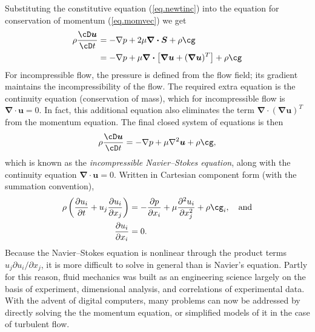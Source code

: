 \documentclass[twoside,11pt]		{report}
\begin{document}
Substituting the constitutive equation (\ref{eq.newtinc}) into the
equation for conservation of momentum (\ref{eq.momvec}) we get
\begin{align}
\rho\frac{\cD \bm{u}}{\cD t}
&=
-\nabla p + 2\mu\bm{\nabla\cdot S} +
 \rho\bm{\cg}\\
&=
-\nabla p+\mu\bm{\nabla\cdot}\left[\bm{\nabla u}+(\bm{\nabla u})^T\right] + 
 \rho\bm{\cg}
\end{align}
For incompressible flow, the pressure is defined from the flow field;
its gradient maintains the incompressibility of the flow. The required
extra equation is the continuity equation (conservation of mass),
which for incompressible flow is $\bm{\nabla\cdot u}=0$.  In fact,
this additional equation also eliminates the term
$\bm{\nabla\cdot}(\bm{\nabla u})^T$ from the momentum equation. The
final closed system of equations is then
\begin{equation}
\rho\frac{\cD \bm{u}}{\cD t}
=
-\nabla p+\mu\nabla^2\bm{u} + \rho\bm{\cg},
\end{equation}
which is known as the \emph{incompressible Navier--Stokes equation},
along with the continuity equation $\bm{\nabla\cdot u}=0$.  Written in
Cartesian component form (with the summation convention),
\begin{align}
\rho\left(\frac{\partial u_i}{\partial t} + u_j\frac{\partial
  u_i}{\partial x_j}\right)
&=
-\frac{\partial p}{\partial x_i} + \mu \frac{\partial^2 u_i}{\partial x_j^2} +
\rho\cg_i, \quad\textrm{and}\\
\frac{\partial u_i}{\partial x_i}
&=
0.
\end{align}
Because the Navier--Stokes equation is nonlinear through the product
terms $u_j\partial u_i/\partial x_j$, it is more difficult to solve in
general than is Navier's equation. Partly for this reason, fluid
mechanics was built as an engineering science largely on the basis of
experiment, dimensional analysis, and correlations of experimental
data. With the advent of digital computers, many problems can now be
addressed by directly solving the the momentum equation, or simplified
models of it in the case of turbulent flow.
\end{document}
